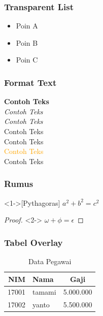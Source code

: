 \documentclass[handout]{beamer}
\begin{document}

\begin{frame}
\frametitle{Transparent List}
\begin{itemize}
	\item<1-> Poin A
	\item<2-> Poin B
	\item<3-> Poin C
\end{itemize}
\end{frame}



\begin{frame}
\frametitle{Format Text}
\textbf<2>{Contoh Teks}\\
\textit<2>{Contoh Teks}\\
\textsl<2>{Contoh Teks}\\
\textrm<2>{Contoh Teks}\\
\textsf<2>{Contoh Teks}\\
\textcolor<2>{orange}{Contoh Teks}\\
\alert<2>{Contoh Teks}\\
\end{frame}



\begin{frame}
\frametitle{Rumus}
\begin{theorem}<1->[Pythagoras]
$ a^2 + b^2 = c^2 $
\end{theorem}

\begin{proof}<2->
$ \omega + \phi = \epsilon $
\end{proof}
\end{frame}



\begin{frame}
\frametitle{Tabel Overlay}
\begin{table}
\begin{tabular}{r | l | c}
	NIM & Nama & Gaji \\
	\hline \hline
	17001 & tamami & 5.000.000 \onslide<2-> \\
	17002 & yanto & 5.500.000 \onslide<3-> \\
\end{tabular}
\caption{Data Pegawai}
\end{table}
\end{frame}
\end{document}
